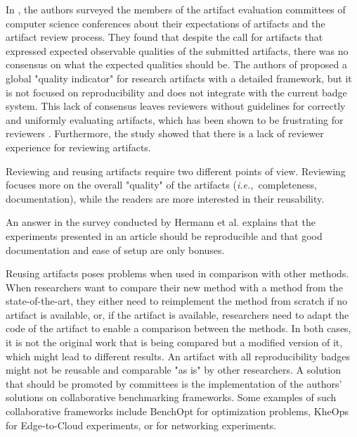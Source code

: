 \documentclass[sigconf,natbib=false]{acmart}
\newcommand{\ie}{\emph{i.e.,}}
\begin{document}
In \cite{hermann2020community}, the authors surveyed the members of the artifact evaluation committees of computer science conferences about their expectations of artifacts and the artifact review process. 
They found that despite the call for artifacts that expressed expected observable qualities of the submitted artifacts, there was no consensus on what the expected qualities should be.
The authors of \cite{castell2024towards} proposed a global "quality indicator" for research artifacts with a detailed framework, but it is not focused on reproducibility and does not integrate with the current badge system.
This lack of consensus leaves reviewers without guidelines for correctly and uniformly evaluating artifacts, which has been shown to be frustrating for reviewers \cite{beller2020will}.
Furthermore, the study showed that there is a lack of reviewer experience for reviewing artifacts.

Reviewing and reusing artifacts require two different points of view.
Reviewing focuses more on the overall "quality" of the artifacts (\ie\ completeness, documentation), while the readers are more interested in their reusability.

An answer in the survey conducted by Hermann et al. \cite{hermann2020community} explains that the experiments presented in an article should be reproducible and that good documentation and ease of setup are only bonuses.

Reusing artifacts poses problems when used in comparison with other methods.
When researchers want to compare their new method with a method from the state-of-the-art, they either need to reimplement the method from scratch if no artifact is available, or, if the artifact is available, researchers need to adapt the code of the artifact to enable a comparison between the methods.
In both cases, it is not the original work that is being compared but a modified version of it, which might lead to different results.
An artifact with all reproducibility badges might not be reusable and comparable "as is" by other researchers.
A solution that should be promoted by committees is the implementation of the authors' solutions on collaborative benchmarking frameworks.
Some examples of such collaborative frameworks include BenchOpt \cite{moreau2022benchopt} for optimization problems, KheOps \cite{rosendo2023kheops} for Edge-to-Cloud experiments, or \cite{sharma2017towards} for networking experiments.
\end{document}
